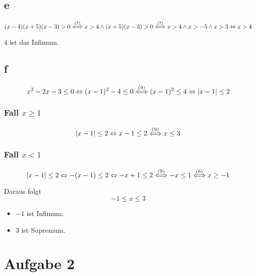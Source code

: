 \documentclass[a4paper,10pt]{article}
\begin{document}
\subsection*{e}

\begin{equation}
 (x - 4)(x + 5)(x - 3) > 0 \overset{\text{(7)}}{\Longleftrightarrow} x > 4 \land (x + 5)(x - 3) > 0 \overset{\text{(7)}}{\Longleftrightarrow} x > 4 \land x > -5 \land x > 3 \Leftrightarrow x > 4
\end{equation}

$4$ ist das Infimum.

\subsection*{f}

\begin{equation}
 x^2 - 2x - 3 \le 0 \Leftrightarrow (x - 1)^2 - 4 \le 0 \overset{\text{(9)}}{\Longleftrightarrow} (x - 1)^2 \le 4 \Leftrightarrow |x - 1| \le 2
\end{equation}

\subsubsection*{Fall $x \ge 1$}

\begin{equation}
 |x - 1| \le 2 \Leftrightarrow x - 1 \le 2 \overset{\text{(9)}}{\Longleftrightarrow} x \le 3
\end{equation}

\subsubsection*{Fall $x < 1$}

\begin{equation}
 |x - 1| \le 2 \Leftrightarrow -(x - 1) \le 2 \Leftrightarrow -x + 1 \le 2 \overset{\text{(9)}}{\Longleftrightarrow} -x \le 1 \overset{\text{(6)}}{\Longleftrightarrow} x \ge -1
\end{equation}

Daraus folgt
\begin{equation}
 -1 \le x \le 3
\end{equation}

\begin{itemize}
 \item $-1$ ist Infimum.
 \item $3$ ist Supremum.
\end{itemize}

\section*{Aufgabe 2}
\end{document}
